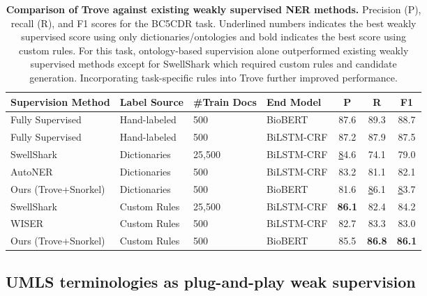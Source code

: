 \documentclass{article}
\begin{document}
\begin{table}[H]
\centering
\noindent
\begin{tabular}{|l|l|l|l|c|c|c|} 
\hline
Supervision Method & Label Source & \#Train Docs & End Model & P    & R    & F1  \\
\hline
Fully Supervised            & Hand-labeled          & 500                    & BioBERT            & 87.6          & 89.3          & 88.7          \\
Fully Supervised    & Hand-labeled          & 500                    & BiLSTM-CRF         & 87.2          & 87.9          & 87.5          \\
\hline
SwellShark          & Dictionaries          & 25,500                 & BiLSTM-CRF         & {\ul 84.6}    & 74.1          & 79.0          \\
AutoNER            & Dictionaries          & 500                    & BiLSTM-CRF         & 83.2          & 81.1          & 82.1          \\
Ours (Trove+Snorkel)        & Dictionaries          & 500                    & BioBERT            & 81.6          & {\ul 86.1}    & {\ul 83.7}    \\
\hline
SwellShark         & Custom Rules          & 25,500                 & BiLSTM-CRF         & \textbf{86.1} & 82.4          & 84.2          \\
WISER              & Custom Rules          & 500                    & BiLSTM-CRF         & 82.7          & 83.3          & 83.0          \\
Ours (Trove+Snorkel)        & Custom Rules          & 500                    & BioBERT            & 85.5          & \textbf{86.8} & \textbf{86.1} \\
\hline
\end{tabular}
\caption{\label{tbl:others} \textbf{Comparison of Trove against existing weakly supervised NER methods.}  Precision (P), recall (R), and F1 scores for the BC5CDR task. Underlined numbers indicates the best weakly supervised score using only dictionaries/ontologies and bold indicates the best score using custom rules.
For this task, ontology-based supervision alone outperformed existing weakly supervised methods except for SwellShark which required custom rules and candidate generation. Incorporating task-specific rules into Trove further improved performance.
}
\end{table}



\subsection*{UMLS terminologies as {plug-and-play} weak supervision}
\end{document}

